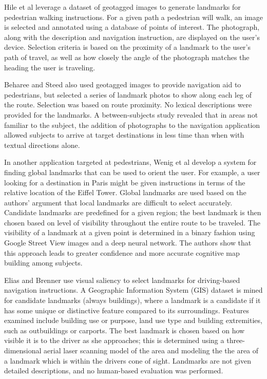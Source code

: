 Hile et al \cite{hile2008landmark} leverage a dataset of geotagged images to generate landmarks for pedestrian walking instructions. For a given path a pedestrian will walk, an image is selected and annotated using a database of points of interest. The photograph, along with the description and navigation instruction, are displayed on the user's device. Selection criteria is based on the proximity of a landmark to the user's path of travel, as well as how closely the angle of the photograph matches the heading the user is traveling.

Beharee and Steed \cite{beeharee2006natural} also used geotagged images to provide navigation aid to pedestrians, but selected a series of landmark photos to show along each leg of the route. Selection was based on route proximity. No lexical descriptions were provided for the landmarks. A between-subjects study revealed that in areas not familiar to the subject, the addition of photographs to the navigation application allowed subjects to arrive at target destinations in less time than when with textual directions alone.

In another application targeted at pedestrians, Wenig et al \cite{wenig2017pharos} develop a system for finding global landmarks that can be used to orient the user. For example, a user looking for a destination in Paris might be given instructions in terms of the relative location of the Eiffel Tower. Global landmarks are used based on the authors' argument that local landmarks are difficult to select accurately. Candidate landmarks are predefined for a given region; the best landmark is then chosen based on level of visibility throughout the entire route to be traveled. The visibility of a landmark at a given point is determined in a binary fashion using Google Street View images and a deep neural network. The authors show that this approach leads to greater confidence and more accurate cognitive map building among subjects.

Elias and Brenner \cite{elias2005automatic} use visual saliency to select landmarks for driving-based navigation instructions. A Geographic Information System (GIS) dataset is mined for candidate landmarks (always buildings), where a landmark is a candidate if it has some unique or distinctive feature compared to its surroundings. Features examined include building use or purpose, land use type and building extremities, such as outbuildings or carports. The best landmark is chosen based on how visible it is to the driver as she approaches; this is determined using a three-dimensional aerial laser scanning model of the area and modeling the the area of a landmark which is within the drivers cone of sight. Landmarks are not given detailed descriptions, and no human-based evaluation was performed.

